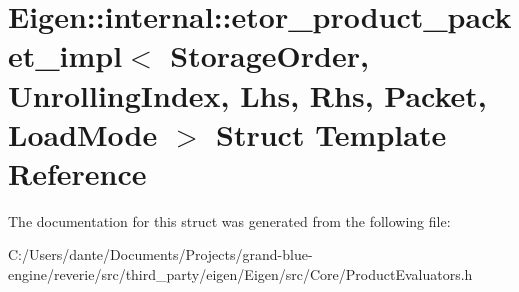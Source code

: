 \hypertarget{struct_eigen_1_1internal_1_1etor__product__packet__impl}{}\section{Eigen\+::internal\+::etor\+\_\+product\+\_\+packet\+\_\+impl$<$ Storage\+Order, Unrolling\+Index, Lhs, Rhs, Packet, Load\+Mode $>$ Struct Template Reference}
\label{struct_eigen_1_1internal_1_1etor__product__packet__impl}


The documentation for this struct was generated from the following file\+:\begin{DoxyCompactItemize}
\item 
C\+:/\+Users/dante/\+Documents/\+Projects/grand-\/blue-\/engine/reverie/src/third\+\_\+party/eigen/\+Eigen/src/\+Core/Product\+Evaluators.\+h\end{DoxyCompactItemize}
